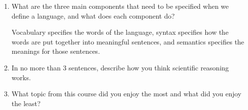 \documentclass[10pt]{article}
\begin{document}
\begin{enumerate}
\setlength\itemsep{3cm}

  \item What are the three main components that need to be specified when we define a language, and what does each component do?
  
  Vocabulary specifies the words of the language, syntax specifies how the words are put together into meaningful sentences, and semantics specifies the meanings for those sentences.

  \item In no more than 3 sentences, describe how you think scientific reasoning works.

  \item What topic from this course did you enjoy the most and what did you enjoy the least?
\end{enumerate}
\end{document}
